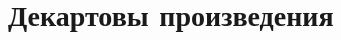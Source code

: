 \documentclass[../main/document.tex]{subfiles}
\begin{document}
\section{Декартовы произведения}
\end{document}
